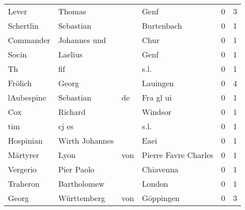 \begin{center}
\begin{tiny}
\begin{longtabu}{llllrr}
                    Lever &                             Thomas &             &                                        Genf &          0 &         3 \\
                Schertlin &                          Sebastian &             &                                  Burtenbach &          0 &         1 \\
                Commander &                       Johannes und &             &                                        Chur &          0 &         1 \\
                    Socin &                            Laelius &             &                                        Genf &          0 &         1 \\
                       Th &                                fif &             &                                        s.l. &          0 &         1 \\
                  Frölich &                              Georg &             &                                    Lauingen &          0 &         4 \\
               lAubespine &                          Sebastian &          de &                                   Fra gl ui &          0 &         1 \\
                      Cox &                            Richard &             &                                     Windsor &          0 &         1 \\
                      tim &                              cj es &             &                                        s.l. &          0 &         1 \\
                Hospinian &                     Wirth Johannes &             &                                        Eaei &          0 &         1 \\
                 Märtyrer &                               Lyon &         von &                        Pierre Favre Charles &          0 &         1 \\
                 Vergerio &                         Pier Paolo &             &                                   Chiavenna &          0 &         1 \\
                 Traheron &                        Bartholomew &             &                                      London &          0 &         1 \\
                    Georg &                        Württemberg &         von &                                   Göppingen &          0 &         3 \\

\end{longtabu}
\end{tiny}
\end{center}
